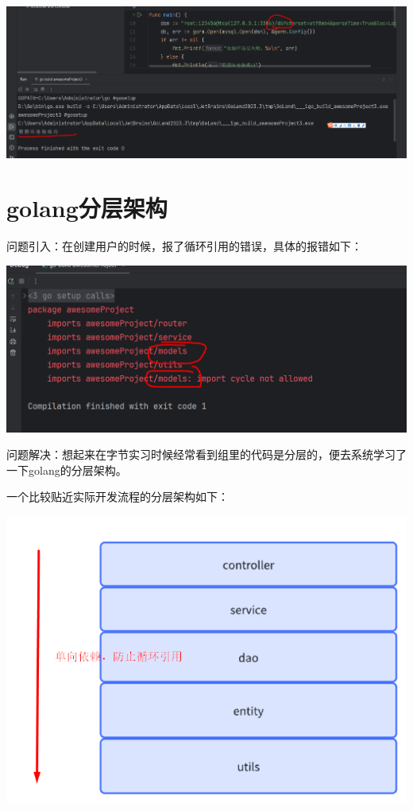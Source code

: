 \documentclass[12pt]{article}
\begin{document}
	\includegraphics[scale=0.5]{5.png}
	
	\section{golang分层架构}
	问题引入：在创建用户的时候，报了循环引用的错误，具体的报错如下：
	
	\includegraphics{6.png}
	
	问题解决：想起来在字节实习时候经常看到组里的代码是分层的，便去系统学习了一下golang的分层架构。
	
	一个比较贴近实际开发流程的分层架构如下：
	
	\includegraphics[scale=0.7]{7.png}
	
\end{document}
